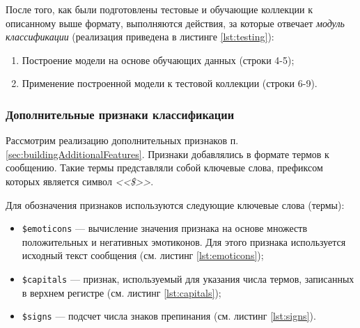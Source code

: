     После того, как были подготовлены тестовые и обучающие коллекции к
    описанному выше формату, выполняются действия, за которые
    отвечает {\it модуль классификации} (реализация приведена в листинге
    \ref{lst:testing}):
    \begin{enumerate}
        \item Построение модели на основе обучающих данных (строки 4-5);
        \item Применение построенной модели к тестовой коллекции (строки 6-9).
    \end{enumerate}

    \lstset{style=python}
    


    \subsubsection{Дополнительные признаки классификации}
    Рассмотрим реализацию дополнительных признаков п.
    \ref{sec:buildingAdditionalFeatures}.
    Признаки добавлялись в формате термов к сообщению.
    Такие термы представляли собой ключевые слова, префиксом которых является
    символ {\it <<\$>>}.

    Для обозначения признаков используются следующие ключевые слова (термы):
    \begin{itemize}
        \item {\tt \$emoticons} --- вычисление значения признака на основе
            множеств положительных и негативных эмотиконов.
            Для этого признака используется исходный текст сообщения
            (см. листинг \ref{lst:emoticons});
        \item {\tt \$capitals} --- признак, используемый для указания числа термов,
            записанных в верхнем регистре (см. листинг \ref{lst:capitals});

        \item {\tt \$signs} --- подсчет числа знаков препинания (см. листинг
            \ref{lst:signs}).
    \end{itemize}

